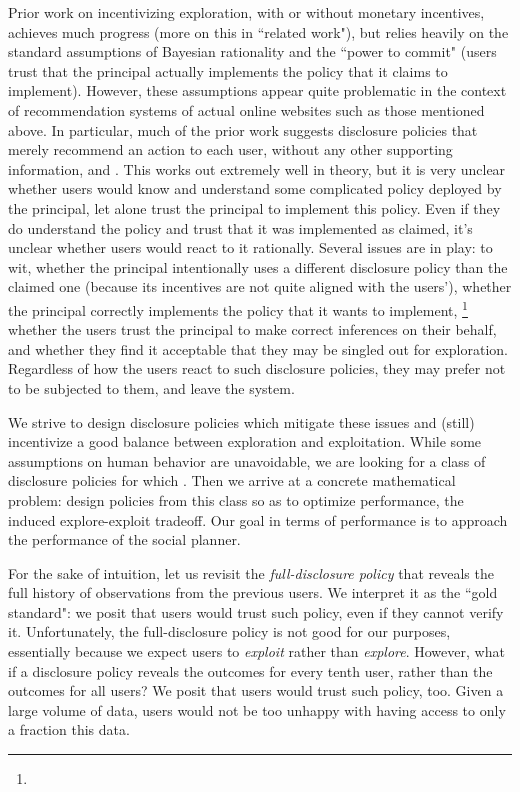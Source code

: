  Prior work on incentivizing exploration, with or without monetary incentives, achieves much progress (more on this in ``related work"), but relies heavily on the standard assumptions of Bayesian rationality and the ``power to commit" (\ie users trust that the principal actually implements the policy that it claims to implement). However, these assumptions appear quite problematic in the context of recommendation systems of actual online websites such as those mentioned above. In particular, much of the prior work suggests disclosure policies that merely recommend an action to each user, without any other supporting information, and . This works out extremely well in theory, but it is very unclear whether users would know and  understand some complicated policy deployed by the principal, let alone trust the principal to implement this policy. Even if they do understand the policy and trust that it was implemented as claimed, it's unclear whether users would react to it rationally.
%
Several issues are in play: to wit, whether the principal intentionally uses a different disclosure policy than the claimed one (\eg because its incentives are not quite aligned with the users'), whether the principal correctly implements the policy that it wants to implement,%
\footnote{}
 whether the users trust the principal to make correct inferences on their behalf, and whether they find it acceptable that they may be singled out for exploration. Regardless of how the users react to such disclosure policies, they may prefer not to be subjected to them, and leave the system.

We strive to design disclosure policies which mitigate these issues and (still) incentivize a good balance between exploration and exploitation. While some assumptions on human behavior are unavoidable, we are looking for a class of disclosure policies for which . Then we arrive at a concrete mathematical problem: design policies from this class so as to optimize performance, \ie  the induced explore-exploit tradeoff. Our goal in terms of performance is to approach the performance of the social planner.

For the sake of intuition, let us revisit the \emph{full-disclosure policy} that reveals the full history of observations from the previous users. We interpret it as the ``gold standard": we posit that users would trust such policy, even if they cannot verify it. Unfortunately, the full-disclosure policy is not good for our purposes, essentially because we expect users to \emph{exploit} rather than \emph{explore}. However, what if a disclosure policy reveals the outcomes for every tenth user, rather than the outcomes for all users? We posit that users would trust such policy, too. Given a large volume of data, users would not be too unhappy with having access to only a fraction this data.

